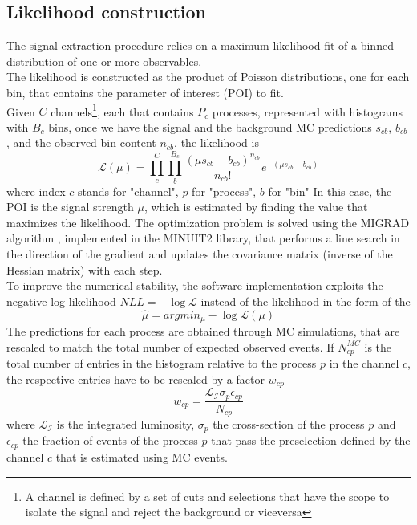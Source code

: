 \subsection{Likelihood construction}
The signal extraction procedure relies on a maximum likelihood fit of a binned distribution of one or more observables.\\
The likelihood is constructed as the product of Poisson distributions, one for each bin, that contains the parameter of interest (POI) to fit.\\
Given $C$ channels\footnote{A channel is defined by a set of cuts and selections that have the scope to isolate the signal and reject the background or viceversa}, each that contains $P_c$ processes, represented with histograms with $B_c$ bins, once we have the signal and the background MC predictions $s_{cb}$, $b_{cb}$, and the observed bin content $n_{cb}$, the likelihood is \cite{Khachatryan2015PreciseTeV}
\begin{equation}
    \mathcal{L}(\mu)=\prod_c^C \prod_b^{B_c} \frac{(\mu s_{cb}+b_{cb})^{n_{cb}}}{n_{cb}!} e^{-(\mu s_{cb}+b_{cb})}
\end{equation}
where index $c$ stands for "channel", $p$ for "process", $b$ for "bin"
In this case, the POI is the signal strength $\mu$, which is estimated by finding the value that maximizes the likelihood. The optimization problem is solved using the \textsc{MIGRAD} algorithm \cite{James1998MINUIT:Manual}, implemented in the \textsc{MINUIT2} library, that performs a line search in the direction of the gradient and updates the covariance matrix (inverse of the Hessian matrix) with each step.\\
To improve the numerical stability, the software implementation exploits the negative log-likelihood $\textit{NLL}=-\log{\mathcal{L}}$ instead of the likelihood in the form of the   
\begin{equation*}
    \hat{\mu}=argmin_\mu - \log{\mathcal{L}(\mu)}
\end{equation*}
The predictions for each process are obtained through MC simulations, that are rescaled to match the total number of expected observed events. If $N^{MC}_{cp}$ is the total number of entries in the histogram relative to the process $p$ in the channel $c$, the respective entries have to be rescaled by a factor $w_{cp}$
\begin{equation}
    w_{cp}=\frac{\mathcal{L_I} \sigma_p \epsilon_{cp}}{N_{cp}}
\end{equation}
where $\mathcal{L_I}$ is the integrated luminosity, $\sigma_p$ the cross-section of the process $p$ and $\epsilon_{cp}$ the fraction of events of the process $p$ that pass the preselection defined by the channel $c$ that is estimated using MC events. 
\\
\newpage
